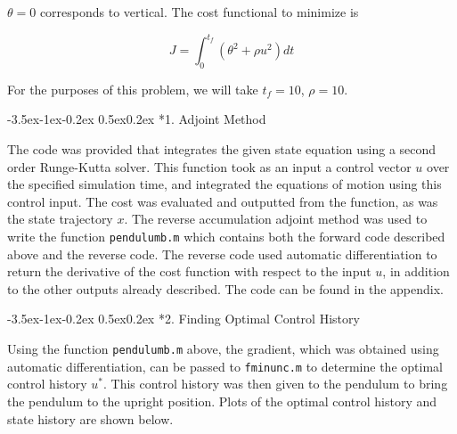 \documentclass[11pt,letterpaper,onecolumn,notitlepage]{article}
\makeatletter
\renewcommand\subsection{\@startsection{subsection}{1}{\z@}%
{-3.5ex\@plus-1ex\@minus-0.2ex}%
{0.5ex\@plus0.2ex}%
{\fontsize{10pt}{10pt}\selectfont\bfseries\sffamily}}
\makeatother
\begin{document}
$\theta=0$ corresponds to vertical.
The cost functional to minimize is

\begin{equation*}
  J=\int_{0}^{t_{f}}(\theta^{2}+\rho u^{2})dt
\end{equation*}

For the purposes of this problem, we will take $t_{f}=10$, $\rho=10$.

\subsection*{1. Adjoint Method}


The code was provided that integrates the given state equation using a second order Runge-Kutta solver.
This function took as an input a control vector $u$ over the specified simulation time, and integrated the equations of motion using this control input.
The cost was evaluated and outputted from the function, as was the state trajectory $x$.
The reverse accumulation adjoint method was used to write the function \texttt{pendulum\textunderscore{}b.m} which contains both the forward code described above and the reverse code.
The reverse code used automatic differentiation to return the derivative of the cost function with respect to the input $u$, in addition to the other outputs already described.
The code can be found in the appendix.

\subsection*{2. Finding Optimal Control History}

Using the function \texttt{pendulum\textunderscore{}b.m} above, the gradient, which was obtained using automatic differentiation, can be passed to \texttt{fminunc.m} to determine the optimal control history $u^{*}$.
This control history was then given to the pendulum to bring the pendulum to the upright position.
Plots of the optimal control history and state history are shown below.
\end{document}
